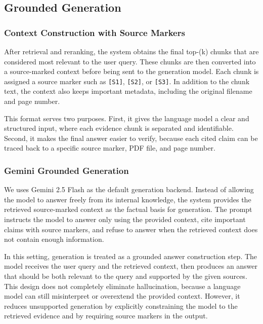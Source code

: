 \documentclass[11pt,a4paper]{article}
\begin{document}
\subsection{Grounded Generation}

\subsubsection{Context Construction with Source Markers}

After retrieval and reranking, the system obtains the final top-(k) chunks
that are considered most relevant to the user query. These chunks are then
converted into a source-marked context before being sent to the generation
model. Each chunk is assigned a source marker such as \texttt{[S1]},
\texttt{[S2]}, or \texttt{[S3]}. In addition to the chunk text, the context also
keeps important metadata, including the original filename and page number.

This format serves two purposes. First, it gives the language model a clear and
structured input, where each evidence chunk is separated and identifiable.
Second, it makes the final answer easier to verify, because each cited claim can
be traced back to a specific source marker, PDF file, and page number.

\subsubsection{Gemini Grounded Generation}

We uses Gemini 2.5 Flash as the default generation backend. Instead
of allowing the model to answer freely from its internal knowledge, the system
provides the retrieved source-marked context as the factual basis for
generation. The prompt instructs the model to answer only using the provided
context, cite important claims with source markers, and refuse to answer when
the retrieved context does not contain enough information.

In this setting, generation is treated as a grounded answer construction step.
The model receives the user query and the retrieved context, then produces an
answer that should be both relevant to the query and supported by the given
sources. This design does not completely eliminate hallucination, because a
language model can still misinterpret or overextend the provided context.
However, it reduces unsupported generation by explicitly constraining the model
to the retrieved evidence and by requiring source markers in the output.
\end{document}
